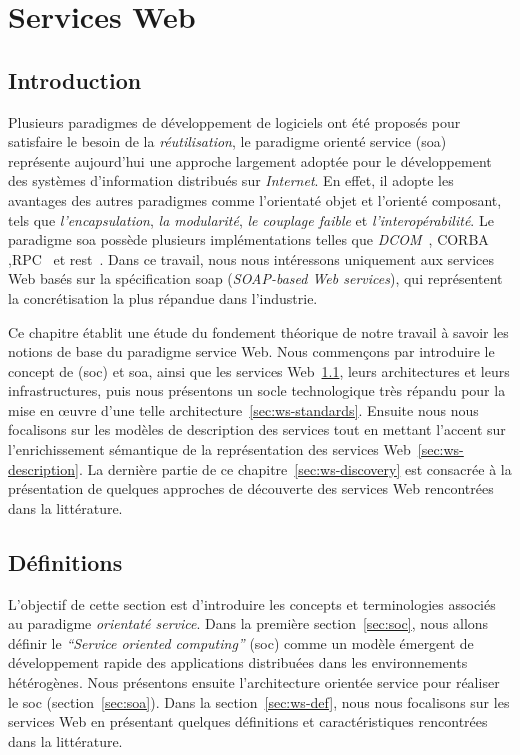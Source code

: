 \chapter{Services Web}
\label{ch:web-service}

\section*{Introduction}
 

Plusieurs paradigmes de développement de logiciels ont été proposés
pour satisfaire le besoin de la \textit{réutilisation}, le paradigme
orienté service (\acrshort{soa}) représente aujourd'hui une approche
largement adoptée pour le développement des systèmes d'information
distribués sur \textit{Internet}. En effet, il adopte les avantages
des autres paradigmes comme l'orientaté objet et l'orienté composant,
tels que \textit{l'encapsulation}, \textit{la modularité}, \textit{le
  couplage faible} et \textit{l'interopérabilité}. Le paradigme
\acrshort{soa} possède plusieurs implémentations telles que
\textit{DCOM}~\cite{frank1997dcom}, \textsc{CORBA}
\cite{vinoski1997corba},\textsc{RPC}~\cite{bloomer1992power} et
\acrshort{rest}~\cite{fielding2000architectural}. Dans ce travail,
nous nous intéressons uniquement aux services Web basés sur la
spécification \acrshort{soap} (\textit{SOAP-based Web services}), qui
représentent la concrétisation la plus répandue dans
l'industrie.\bigskip

Ce chapitre établit une étude du fondement théorique de notre travail
à savoir les notions de base du paradigme service Web. Nous commençons
par introduire le concept de (\acrshort{soc}) et \acrshort{soa}, ainsi
que les services Web~\ref{sec:ws-definitions}, leurs architectures et
leurs infrastructures, puis nous présentons un socle technologique
très répandu pour la mise en œuvre d'une telle
architecture~\ref{sec:ws-standards}. Ensuite nous nous focalisons sur
les modèles de description des services tout en mettant l'accent sur
l'enrichissement sémantique de la représentation des services
Web~\ref{sec:ws-description}. La dernière partie de ce
chapitre~\ref{sec:ws-discovery} est consacrée à la présentation de
quelques approches de découverte des services Web rencontrées dans la
littérature.

\newpage
\section{Définitions}
\label{sec:ws-definitions}
L'objectif de cette section est d'introduire les concepts et
terminologies associés au paradigme \textit{orientaté service}. Dans
la première section~\ref{sec:soc}, nous allons définir le
\textit{``Service oriented computing''} (\acrshort{soc}) comme un
modèle émergent de développement rapide des applications distribuées
dans les environnements hétérogènes. Nous présentons ensuite
l'architecture orientée service pour réaliser le \acrshort{soc}
(section~\ref{sec:soa}). Dans la section~\ref{sec:ws-def}, nous nous
focalisons sur les services Web en présentant quelques définitions et
caractéristiques rencontrées dans la littérature.

